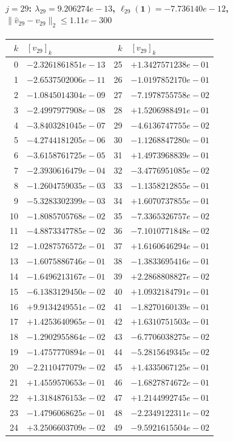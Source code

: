 \paragraph{$j = 29$: $\lambda_{29} = 9.206274e-13$, \quad $\ell_{29}(\mathbf{1}) = -7.736140e-12$, \quad $\|\hat{v}_{29} - v_{29}\|_2 \leq 1.11e-300$}
\begin{center}
{\footnotesize
\begin{tabular}{r@{\;\;}l@{\quad}r@{\;\;}l}
\toprule
$k$ & $[v_{29}]_k$ & $k$ & $[v_{29}]_k$ \\
\midrule
0 & $-2.3261861851e-13$ & 25 & $+1.3427571238e-01$ \\
1 & $-2.6537502006e-11$ & 26 & $-1.0197852170e-01$ \\
2 & $-1.0845014304e-09$ & 27 & $-7.1978755758e-02$ \\
3 & $-2.4997977908e-08$ & 28 & $+1.5206988491e-01$ \\
4 & $-3.8403281045e-07$ & 29 & $-4.6136747755e-02$ \\
5 & $-4.2744181205e-06$ & 30 & $-1.1268847280e-01$ \\
6 & $-3.6158761725e-05$ & 31 & $+1.4973968839e-01$ \\
7 & $-2.3930616479e-04$ & 32 & $-3.4776951085e-02$ \\
8 & $-1.2604759035e-03$ & 33 & $-1.1358212855e-01$ \\
9 & $-5.3283302399e-03$ & 34 & $+1.6070737855e-01$ \\
10 & $-1.8085705768e-02$ & 35 & $-7.3365326757e-02$ \\
11 & $-4.8873347785e-02$ & 36 & $-7.1010771848e-02$ \\
12 & $-1.0287576572e-01$ & 37 & $+1.6160646294e-01$ \\
13 & $-1.6075886746e-01$ & 38 & $-1.3833695416e-01$ \\
14 & $-1.6496213167e-01$ & 39 & $+2.2868808827e-02$ \\
15 & $-6.1383129450e-02$ & 40 & $+1.0932184791e-01$ \\
16 & $+9.9134249551e-02$ & 41 & $-1.8270160139e-01$ \\
17 & $+1.4253640965e-01$ & 42 & $+1.6310751503e-01$ \\
18 & $-1.2902955864e-02$ & 43 & $-6.7706038275e-02$ \\
19 & $-1.4757770894e-01$ & 44 & $-5.2815649345e-02$ \\
20 & $-2.2110477079e-02$ & 45 & $+1.4335067125e-01$ \\
21 & $+1.4559570653e-01$ & 46 & $-1.6827874672e-01$ \\
22 & $+1.3184876153e-02$ & 47 & $+1.2144992745e-01$ \\
23 & $-1.4796068625e-01$ & 48 & $-2.2349122311e-02$ \\
24 & $+3.2506603709e-02$ & 49 & $-9.5921615504e-02$ \\
\bottomrule
\end{tabular}
}
\end{center}

